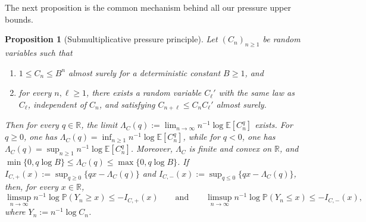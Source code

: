 \documentclass[11pt]{amsart}
\numberwithin{equation}{section}
\theoremstyle{plain}
\newtheorem{proposition}[theorem]{Proposition}
\theoremstyle{definition}
\theoremstyle{remark}
\begin{document}
The next proposition is the common mechanism behind all our pressure upper bounds.

\begin{proposition}[Submultiplicative pressure principle]\label{prop:abstract-pressure}
Let \((C_n)_{n\ge1}\) be random variables such that
\begin{enumerate}
	\item \(1\le C_n\le B^n\) almost surely for a deterministic constant \(B\ge1\), and
	\item for every \(n,\ell\ge1\), there exists a random variable \(C_\ell'\) with the same law as \(C_\ell\), independent of \(C_n\), and satisfying \(C_{n+\ell}\le C_nC_\ell'\) almost surely. 
\end{enumerate}
	 Then for every \(q\in\mathbb R\), the limit \(\Lambda_C(q):=\lim_{n\to\infty} n^{-1}\log\mathbb E[C_n^q]\) exists. For \(q\ge0\), one has \(\Lambda_C(q)=\inf_{n\ge1} n^{-1}\log\mathbb E[C_n^q]\), while for \(q<0\), one has \(\Lambda_C(q)=\sup_{n\ge1} n^{-1}\log\mathbb E[C_n^q]\). Moreover, \(\Lambda_C\) is finite and convex on \(\mathbb R\), and \(\min\{0,q\log B\}\le\Lambda_C(q)\le\max\{0,q\log B\}\). If \(I_{C,+}(x):=\sup_{q\ge0}\{qx-\Lambda_C(q)\}\) and \(I_{C,-}(x):=\sup_{q\le0}\{qx-\Lambda_C(q)\}\), then, for every \(x\in\mathbb R\),
\[
\limsup_{n\to\infty} n^{-1}\log\mathbb P(Y_n\ge x)\le -I_{C,+}(x)
\qquad\text{and}\qquad
\limsup_{n\to\infty} n^{-1}\log\mathbb P(Y_n\le x)\le -I_{C,-}(x),
\]
where \(Y_n:=n^{-1}\log C_n\).
\end{proposition}
\end{document}
